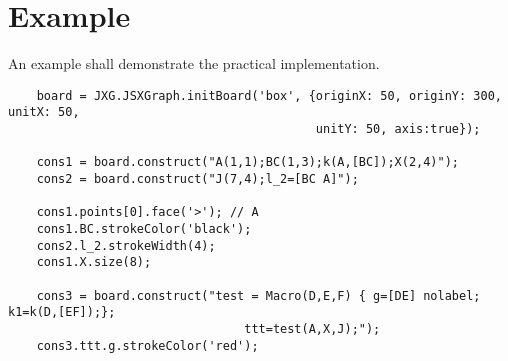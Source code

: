 \documentclass[10pt]{article}
\begin{document}
\section{Example}
An example shall demonstrate the practical implementation.
\begin{verbatim}
    board = JXG.JSXGraph.initBoard('box', {originX: 50, originY: 300, unitX: 50,
                                           unitY: 50, axis:true});

    cons1 = board.construct("A(1,1);BC(1,3);k(A,[BC]);X(2,4)");
    cons2 = board.construct("J(7,4);l_2=[BC A]");

    cons1.points[0].face('>'); // A
    cons1.BC.strokeColor('black');
    cons2.l_2.strokeWidth(4);
    cons1.X.size(8);

    cons3 = board.construct("test = Macro(D,E,F) { g=[DE] nolabel; k1=k(D,[EF]);};
                                 ttt=test(A,X,J);");
    cons3.ttt.g.strokeColor('red');
\end{verbatim}
\end{document}
